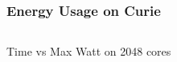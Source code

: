 \documentclass{beamer}
\begin{document}
  \begin{frame}
    
\frametitle{Energy Usage on Curie}
\begin{columns}
\begin{column}{6cm}
    \begin{center}
{\vspace{-1em}\small Time vs Max Watt on 2048 cores}
  \end{center}
\end{column}
\begin{column}{6cm}

\end{column}
\end{columns}
\end{frame}
\end{document}
